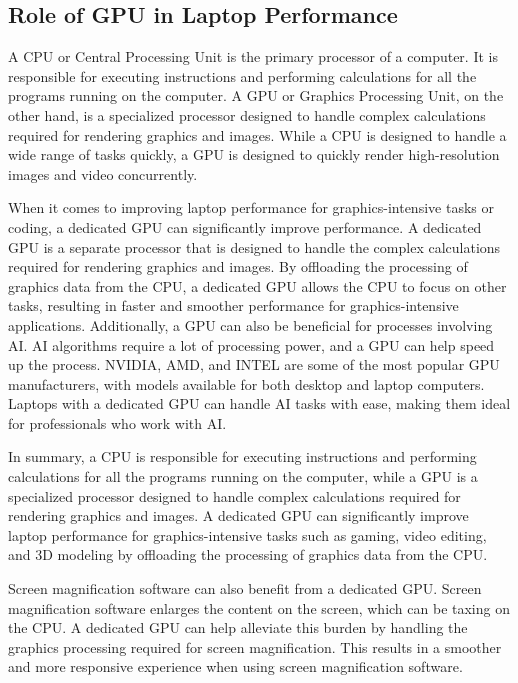 \pagebreak	\hypertarget{gpu-needs}{}\subsection{Role of GPU in Laptop Performance}\label{gpu-needs}
A CPU or Central Processing Unit is the primary processor of a computer. It is responsible for executing instructions and performing calculations for all the programs running on the computer. A GPU or Graphics Processing Unit, on the other hand, is a specialized processor designed to handle complex calculations required for rendering graphics and images. While a CPU is designed to handle a wide range of tasks quickly, a GPU is designed to quickly render high-resolution images and video concurrently.

When it comes to improving laptop performance for graphics-intensive tasks or coding, a dedicated GPU can significantly improve performance. A dedicated GPU is a separate processor that is designed to handle the complex calculations required for rendering graphics and images. By offloading the processing of graphics data from the CPU, a dedicated GPU allows the CPU to focus on other tasks, resulting in faster and smoother performance for graphics-intensive applications. Additionally, a GPU can also be beneficial for processes involving AI. AI algorithms require a lot of processing power, and a GPU can help speed up the process. NVIDIA, AMD, and INTEL are some of the most popular GPU manufacturers, with models available for both desktop and laptop computers. Laptops with a dedicated GPU can handle AI tasks with ease, making them ideal for professionals who work with AI.

In summary, a CPU is responsible for executing instructions and performing calculations for all the programs running on the computer, while a GPU is a specialized processor designed to handle complex calculations required for rendering graphics and images. A dedicated GPU can significantly improve laptop performance for graphics-intensive tasks such as gaming, video editing, and 3D modeling by offloading the processing of graphics data from the CPU. 

Screen magnification software can also benefit from a dedicated GPU. Screen magnification software enlarges the content on the screen, which can be taxing on the CPU. A dedicated GPU can help alleviate this burden by handling the graphics processing required for screen magnification. This results in a smoother and more responsive experience when using screen magnification software.

